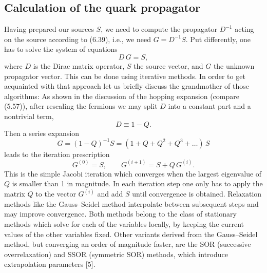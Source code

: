 \subsection{Calculation of the quark propagator}

Having prepared our sources $S$, we need to compute the propagator $D^{-1}$
acting on the source according to (6.39), i.e., we need $G = D^{-1}S$. Put
differently, one has to solve the system of equations
\begin{equation}
  D\, G = S ,
\end{equation}
where $D$ is the Dirac matrix operator, $S$ the source vector, and $G$ the
unknown propagator vector. This can be done using iterative methods. In order
to get acquainted with that approach let us briefly discuss the grandmother of
those algorithms: As shown in the discussion of the hopping expansion (compare
(5.57)), after rescaling the fermions we may split $D$ into a constant part and
a nontrivial term,
\begin{equation}
  D \equiv 1 - Q .
\end{equation}
Then a series expansion
\begin{equation}
  G = (1 - Q)^{-1} S = (1 + Q + Q^2 + Q^3 + \ldots)\, S
\end{equation}
leads to the iteration prescription
\begin{equation}
  G^{(0)} = S , \qquad G^{(i+1)} = S + Q\, G^{(i)} .
\end{equation}
This is the simple Jacobi iteration which converges when the largest eigenvalue
of $Q$ is smaller than 1 in magnitude. In each iteration step one only has to
apply the matrix $Q$ to the vector $G^{(i)}$ and add $S$ until convergence is
obtained. Relaxation methods like the Gauss--Seidel method interpolate between
subsequent steps and may improve convergence. Both methods belong to the class
of stationary methods which solve for each of the variables locally, by keeping
the current values of the other variables fixed. Other variants derived from
the Gauss--Seidel method, but converging an order of magnitude faster, are the
SOR (successive overrelaxation) and SSOR (symmetric SOR) methods, which
introduce extrapolation parameters [5].

